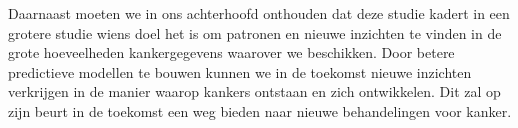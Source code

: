 Daarnaast moeten we in ons achterhoofd onthouden dat deze studie kadert in een grotere studie wiens doel het is om patronen en nieuwe inzichten te vinden in de grote hoeveelheden kankergegevens waarover we beschikken. Door betere predictieve modellen te bouwen kunnen we in de toekomst nieuwe inzichten verkrijgen in de manier waarop kankers ontstaan en zich ontwikkelen. Dit zal op zijn beurt in de toekomst een weg bieden naar nieuwe behandelingen voor kanker.


